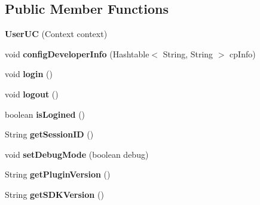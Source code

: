 \subsection*{Public Member Functions}
\begin{DoxyCompactItemize}
\item 
\mbox{\label{classorg_1_1cocos2dx_1_1plugin_1_1UserUC_a0e1377162ec3be46e2d5a59be4916954}} 
{\bfseries User\+UC} (Context context)
\item 
\mbox{\label{classorg_1_1cocos2dx_1_1plugin_1_1UserUC_a99fb47d283471c9c036454d3a45b0ede}} 
void {\bfseries config\+Developer\+Info} (Hashtable$<$ String, String $>$ cp\+Info)
\item 
\mbox{\label{classorg_1_1cocos2dx_1_1plugin_1_1UserUC_aae3b1655a185295c4f0f48e02b845b18}} 
void {\bfseries login} ()
\item 
\mbox{\label{classorg_1_1cocos2dx_1_1plugin_1_1UserUC_acf35b6cf07d8d1bcf2a00c4259e2bfa8}} 
void {\bfseries logout} ()
\item 
\mbox{\label{classorg_1_1cocos2dx_1_1plugin_1_1UserUC_ad1f38915d0598866b8f6001ae71d4d46}} 
boolean {\bfseries is\+Logined} ()
\item 
\mbox{\label{classorg_1_1cocos2dx_1_1plugin_1_1UserUC_a4316de4c6a7843e171de5beed8783e1b}} 
String {\bfseries get\+Session\+ID} ()
\item 
\mbox{\label{classorg_1_1cocos2dx_1_1plugin_1_1UserUC_a13b27de7b203f23006fe7995ffb44f06}} 
void {\bfseries set\+Debug\+Mode} (boolean debug)
\item 
\mbox{\label{classorg_1_1cocos2dx_1_1plugin_1_1UserUC_aecc816e1f4743d40d7096acd0cc8a9ca}} 
String {\bfseries get\+Plugin\+Version} ()
\item 
\mbox{\label{classorg_1_1cocos2dx_1_1plugin_1_1UserUC_a2cc9352b2fd2023be6cc5cb80e623e31}} 
String {\bfseries get\+S\+D\+K\+Version} ()
\end{DoxyCompactItemize}
